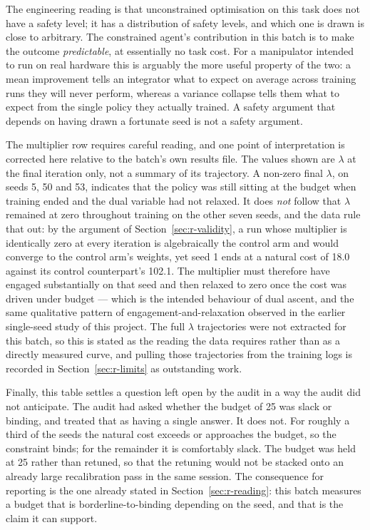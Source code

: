 The engineering reading is that unconstrained optimisation on this task does not have a safety
level; it has a distribution of safety levels, and which one is drawn is close to arbitrary. The
constrained agent's contribution in this batch is to make the outcome \emph{predictable}, at essentially
no task cost. For a manipulator intended to run on real hardware this is arguably the more useful
property of the two: a mean improvement tells an integrator what to expect on average across
training runs they will never perform, whereas a variance collapse tells them what to expect from
the single policy they actually trained. A safety argument that depends on having drawn a
fortunate seed is not a safety argument.

The multiplier row requires careful reading, and one point of interpretation is corrected here
relative to the batch's own results file. The values shown are \(\lambda\) at the final iteration only, not
a summary of its trajectory. A non-zero final \(\lambda\), on seeds 5, 50 and 53, indicates that the policy
was still sitting at the budget when training ended and the dual variable had not relaxed. It does
\emph{not} follow that \(\lambda\) remained at zero throughout training on the other seven seeds, and the data
rule that out: by the argument of Section~\ref{sec:r-validity}, a run whose multiplier is identically zero at every
iteration is algebraically the control arm and would converge to the control arm's weights, yet
seed 1 ends at a natural cost of 18.0 against its control counterpart's 102.1. The multiplier must
therefore have engaged substantially on that seed and then relaxed to zero once the cost was
driven under budget --- which is the intended behaviour of dual ascent, and the same qualitative
pattern of engagement-and-relaxation observed in the earlier single-seed study of this project.
The full \(\lambda\) trajectories were not extracted for this batch, so this is stated as the reading the
data requires rather than as a directly measured curve, and pulling those trajectories from the
training logs is recorded in Section~\ref{sec:r-limits} as outstanding work.

Finally, this table settles a question left open by the audit in a way the audit did not
anticipate. The audit had asked whether the budget of 25 was slack or binding, and treated that as
having a single answer. It does not. For roughly a third of the seeds the natural cost exceeds or
approaches the budget, so the constraint binds; for the remainder it is comfortably slack. The
budget was held at 25 rather than retuned, so that the retuning would not be stacked onto an
already large recalibration pass in the same session. The consequence for reporting is the one
already stated in Section~\ref{sec:r-reading}: this batch measures a budget that is borderline-to-binding
depending on the seed, and that is the claim it can support.

